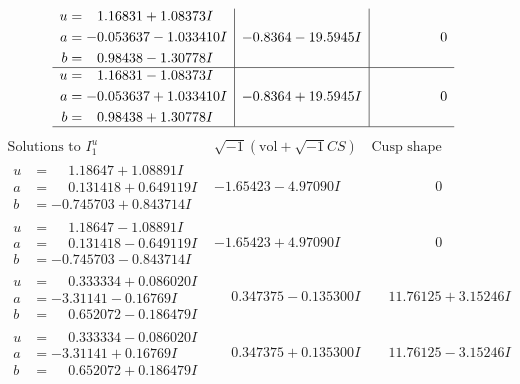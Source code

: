 \documentclass[1p]{elsarticle_modified}
\theoremstyle{definition}
\newcommand{\I}{\sqrt{-1}}
\begin{document}
$$\begin{array}{c|c|c}
\begin{aligned}
u &= \phantom{-}1.16831 + 1.08373 I \\
a &= -0.053637 - 1.033410 I \\
b &= \phantom{-}0.98438 - 1.30778 I\end{aligned}
 & -0.8364 - 19.5945 I & \phantom{-0.000000 } 0 \\ \hline\begin{aligned}
u &= \phantom{-}1.16831 - 1.08373 I \\
a &= -0.053637 + 1.033410 I \\
b &= \phantom{-}0.98438 + 1.30778 I\end{aligned}
 & -0.8364 + 19.5945 I & \phantom{-0.000000 } 0\\
 \hline 
 \end{array}$$\newpage$$\begin{array}{c|c|c}  
\text{Solutions to }I^u_{1}& \I (\text{vol} + \sqrt{-1}CS) & \text{Cusp shape}\\
 \hline 
\begin{aligned}
u &= \phantom{-}1.18647 + 1.08891 I \\
a &= \phantom{-}0.131418 + 0.649119 I \\
b &= -0.745703 + 0.843714 I\end{aligned}
 & -1.65423 - 4.97090 I & \phantom{-0.000000 } 0 \\ \hline\begin{aligned}
u &= \phantom{-}1.18647 - 1.08891 I \\
a &= \phantom{-}0.131418 - 0.649119 I \\
b &= -0.745703 - 0.843714 I\end{aligned}
 & -1.65423 + 4.97090 I & \phantom{-0.000000 } 0 \\ \hline\begin{aligned}
u &= \phantom{-}0.333334 + 0.086020 I \\
a &= -3.31141 - 0.16769 I \\
b &= \phantom{-}0.652072 - 0.186479 I\end{aligned}
 & \phantom{-}0.347375 - 0.135300 I & \phantom{-}11.76125 + 3.15246 I \\ \hline\begin{aligned}
u &= \phantom{-}0.333334 - 0.086020 I \\
a &= -3.31141 + 0.16769 I \\
b &= \phantom{-}0.652072 + 0.186479 I\end{aligned}
 & \phantom{-}0.347375 + 0.135300 I & \phantom{-}11.76125 - 3.15246 I \\ \hline\begin{aligned}

\end{aligned}
\end{array}$$
\end{document}
